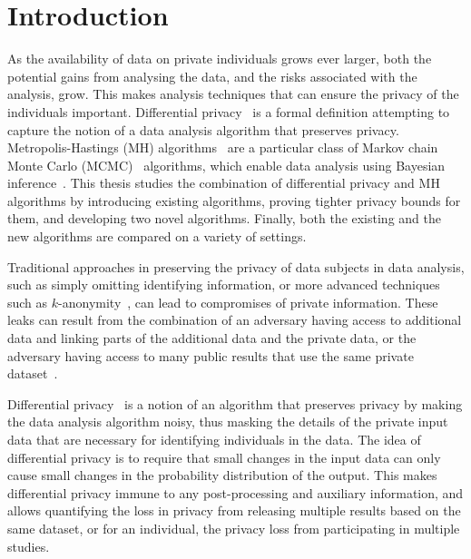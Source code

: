 \documentclass[english,twoside,openright]{HYgraduMLDS}
\begin{document}
\mynomenclature

\chapter{Introduction}

As the availability of data on private individuals grows ever larger, both the
potential gains from analysing the data, and the risks associated with the
analysis, grow. This makes analysis techniques that can ensure the privacy
of the individuals important. Differential
privacy~\cite{DMN06} is a formal definition attempting to capture the notion
of a data analysis algorithm that preserves privacy.
Metropolis-Hastings (MH) algorithms~\cite{MRR53, Has70} are a particular class of
Markov chain Monte Carlo (MCMC)~\cite{Robert04} algorithms, which
enable data analysis using
Bayesian inference~\cite{BDA}. This thesis studies the combination of
differential privacy and MH algorithms by introducing existing algorithms, proving
tighter privacy bounds for them, and developing two novel algorithms.
Finally, both the existing and the new algorithms are compared on a variety of
settings.

Traditional approaches in preserving the privacy of data subjects in data
analysis, such as simply omitting identifying information, or
more advanced techniques such as \(k\)-anonymity~\cite{SaS98, Sam01},
can lead to compromises of private information. These leaks can result from
the combination of an
adversary having access to additional data and linking parts of the additional
data and the private data, or the adversary having access to many
public results that use the same private dataset~\cite{DiN03}.

Differential privacy~\cite{DMN06} is a notion of an algorithm that preserves
privacy by making the data analysis algorithm noisy, thus masking the details of
the private input data that are necessary for identifying individuals in the data.
The idea of differential privacy is to require that small changes in the input
data can only cause small changes in the probability distribution of the
output. This makes differential privacy immune to any post-processing and
auxiliary information, and allows quantifying the loss in privacy from releasing
multiple results based on the same dataset, or for an individual, the privacy
loss from participating in multiple studies.
\end{document}

